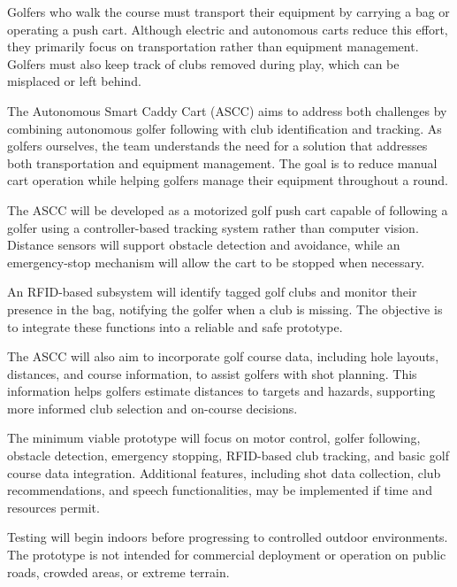 
\label{sec:introduction}


Golfers who walk the course must transport their equipment by carrying a bag or operating a push cart. Although electric and autonomous carts reduce this effort, they primarily focus on transportation rather than equipment management. Golfers must also keep track of clubs removed during play, which can be misplaced or left behind.

The Autonomous Smart Caddy Cart (ASCC) aims to address both challenges by combining autonomous golfer following with club identification and tracking. As golfers ourselves, the team understands the need for a solution that addresses both transportation and equipment management. The goal is to reduce manual cart operation while helping golfers manage their equipment throughout a round.


The ASCC will be developed as a motorized golf push cart capable of following a golfer using a controller-based tracking system rather than computer vision. Distance sensors will support obstacle detection and avoidance, while an emergency-stop mechanism will allow the cart to be stopped when necessary.

An RFID-based subsystem will identify tagged golf clubs and monitor their presence in the bag, notifying the golfer when a club is missing. The objective is to integrate these functions into a reliable and safe prototype.

The ASCC will also aim to incorporate golf course data, including hole layouts, distances, and course information, to assist golfers with shot planning. This information helps golfers estimate distances to targets and hazards, supporting more informed club selection and on-course decisions.


The minimum viable prototype will focus on motor control, golfer following, obstacle detection, emergency stopping, RFID-based club tracking, and basic golf course data integration. Additional features, including shot data collection, club recommendations, and speech functionalities, may be implemented if time and resources permit.

Testing will begin indoors before progressing to controlled outdoor environments. The prototype is not intended for commercial deployment or operation on public roads, crowded areas, or extreme terrain.



